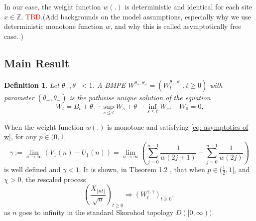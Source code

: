 \documentclass[twoside,12pt,a4paper]{article}
\newtheorem{definition}{Definition}[section]
\numberwithin{equation}{section}
\newcommand\TBD{\textcolor{red}{TBD.}}
\begin{document}
	In our case, the weight function $w(.)$ is deterministic and identical for each site $x\in \mathbb{Z}$. \TBD (Add backgrounds on the model assumptions, especially why we use deterministic monotone function $w$, and why this is called asymptotically free case. )
	
	\subsection{Main Result}
	\begin{definition}
		Let $\theta_+, \theta_- <1$. A BMPE $W^{\theta_+, \theta_-} = \left(W^{\theta_+, \theta_-}_t, t\geq 0\right)$ with parameter  $(\theta_+, \theta_-)$ is the pathwise unique solution of the equation
		$$
		W_t = B_t + \theta_+ \cdot \sup_{s\leq t} W_s  + \theta_- \cdot \inf_{s\leq t} W_s,   \quad W_0 = 0.
		$$
	\end{definition}
	When the weight function $w(.)$ is monotone and satisfying \eqref{eq: asymptotics of w}, for any $p\in (0,1]$
	\begin{equation}\label{eq: gamma}
		\gamma:= \lim_{n\to \infty}\left( V_1(n) - U_1(n) \right) =\lim_{n\to \infty} \left( \sum_{j=0}^{n-1} \frac{1}{ w(2j+1)}-  \sum_{j=0}^{n-1}  \frac{1}{w(2j)} \right) 
	\end{equation}
	is well defined and $\gamma<1$. It is shown, in Theorem 1.2 \cite{KMP22}, that when $p\in (\frac{1}{2},1]$, and $\mathcal{\chi} >0 $, the rescaled process
	$$
	\left(  \frac{X_{\lfloor nt \rfloor }}{\sqrt{n}}  \right)_{t\geq 0} \Longrightarrow \left( W^{\gamma,\gamma}_{t}\right)_{t\geq 0},
	$$ as $n$ goes to infinity in the standard Skorohod topology $D([0,\infty) ).$
	
\end{document}
